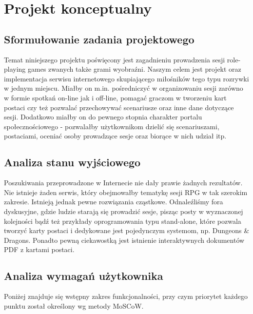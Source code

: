 \chapter{Projekt konceptualny}
\label{cha:konceptualny}

\section{Sformułowanie zadania projektowego}
\label{sec:sforzadproj}

Temat niniejszego projektu poświęcony jest zagadnieniu prowadzenia sesji role-playing games zwanych także grami wyobraźni. Naszym celem jest projekt oraz implementacja serwisu internetowego skupiającego miłośników tego typu rozrywki w jednym miejscu. Miałby on m.in. pośredniczyć w organizowaniu sesji zarówno w formie spotkań on-line jak i off-line, pomagać graczom w tworzeniu kart postaci czy też pozwalać przechowywać scenariusze oraz inne dane dotyczące sesji. Dodatkowo miałby on do pewnego stopnia charakter portalu społecznościowego - pozwalałby użytkownikom dzielić się scenariuszami, postaciami, oceniać osoby prowadzące sesje oraz biorące w nich udział itp.


\section{Analiza stanu wyjściowego}
\label{sec:stanwyjsciowy}

Poszukiwania przeprowadzone w Internecie nie dały prawie żadnych rezultatów. Nie istnieje żaden serwis, który obejmowałby tematykę sesji RPG w tak szerokim zakresie. Istnieją jednak pewne rozwiązania cząstkowe. Odnaleźliśmy fora dyskusyjne, gdzie ludzie starają się prowadzić sesje, pisząc posty w wyznaczonej kolejności bądź też przykłady oprogramowania typu stand-alone, które pozwala tworzyć karty postaci i dedykowane jest pojedynczym systemom, np. Dungeons \& Dragons. Ponadto pewną ciekawostką jest istnienie interaktywnych dokumentów PDF z kartami postaci.


\section{Analiza wymagań użytkownika}
\label{sec:wymagania}

Poniżej znajduje się wstępny zakres funkcjonalności, przy czym priorytet każdego punktu został określony wg metody MoSCoW.

